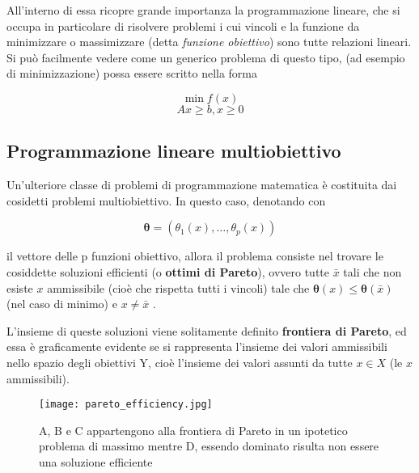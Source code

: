 All'interno di essa ricopre 
grande importanza la programmazione lineare, che si occupa in particolare di risolvere 
problemi i cui vincoli e la funzione da minimizzare o massimizzare (detta 
\textit{funzione obiettivo}) sono tutte relazioni lineari\cite{walsh1985introduction}.
Si può facilmente vedere come un generico problema di questo tipo, (ad esempio di minimizzazione) 
possa essere scritto nella forma\cite{1990}

\begin{equation*}
    \min f(x)
    \label{eq:}
\end{equation*}
\begin{equation*}
    Ax \geq b, x \geq 0
    \label{eq:}
\end{equation*}

\subsection{Programmazione lineare multiobiettivo}
\label{section:lin_programming_mo}

Un'ulteriore classe di problemi di programmazione matematica è costituita dai cosidetti
problemi multiobiettivo. In questo caso, denotando con 

\begin{equation*}
    \mathbf{\theta} = (\theta_1(x), \dots, \theta_p(x))
    \label{eq:}
\end{equation*}

il vettore delle p funzioni obiettivo, allora il problema consiste nel trovare le 
cosiddette soluzioni efficienti (o \textbf{ottimi di Pareto}), ovvero tutte $\bar{x}$ tali 
che non esiste $x$ ammissibile (cioè che rispetta tutti i vincoli) tale che 
$\mathbf{\theta}(x) \leq \mathbf{\theta}(\bar{x})$ (nel caso di minimo) e 
$x \neq \bar{x}$ \cite{walsh1985introduction}.

L'insieme di queste soluzioni viene solitamente definito \textbf{frontiera di Pareto}, 
ed essa è graficamente evidente se si rappresenta l'insieme dei valori ammissibili nello 
spazio degli obiettivi Y, cioè l'insieme dei valori assunti da tutte $x \in X$ 
(le $x$ ammissibili).

\begin{figure}
    \begin{small}
        \begin{center}
            \texttt{[image: pareto\_efficiency.jpg]}
        \end{center}
        \caption{A, B e C appartengono alla frontiera di Pareto
            in un ipotetico problema di massimo mentre D, essendo dominato
            risulta non essere una soluzione efficiente \cite{Pettinger2017}}
        \label{fig:obj}
    \end{small}
\end{figure}


